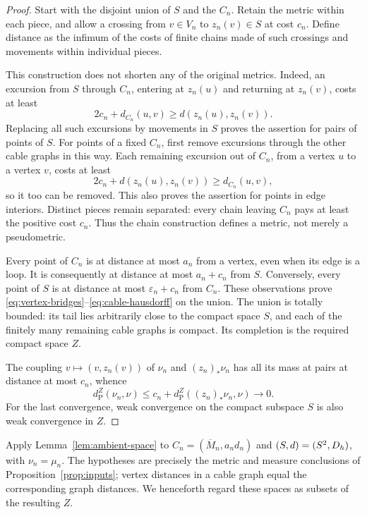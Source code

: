 \begin{proof}
Start with the disjoint union of $S$ and the $C_n$.  Retain the metric
within each piece, and allow a crossing from $v\in V_n$ to $z_n(v)\in S$
at cost $c_n$.  Define distance as the infimum of the costs of finite
chains made of such crossings and movements within individual pieces.

This construction does not shorten any of the original metrics.  Indeed,
an excursion from $S$ through $C_n$, entering at $z_n(u)$ and returning
at $z_n(v)$, costs at least
\[
 2c_n+d_{C_n}(u,v)\ge d(z_n(u),z_n(v)).
\]
Replacing all such excursions by movements in $S$ proves the assertion
for pairs of points of $S$.  For points of a fixed $C_n$, first remove
excursions through the other cable graphs in this way.  Each remaining
excursion out of $C_n$, from a vertex $u$ to a vertex $v$, costs at least
\[
 2c_n+d(z_n(u),z_n(v))\ge d_{C_n}(u,v),
\]
so it too can be removed.  This also proves the assertion for points in
edge interiors.  Distinct pieces remain separated: every chain leaving
$C_n$ pays at least the positive cost $c_n$.  Thus the chain construction
defines a metric, not merely a pseudometric.

Every point of $C_n$ is at distance at most $a_n$ from a vertex, even
when its edge is a loop.  It is consequently at distance at most
$a_n+c_n$ from $S$.  Conversely, every point of $S$ is at distance at
most $\varepsilon_n+c_n$ from $C_n$.  These observations prove
\eqref{eq:vertex-bridges}--\eqref{eq:cable-hausdorff} on the union.  The
union is totally bounded: its tail lies arbitrarily close to the compact
space $S$, and each of the finitely many remaining cable graphs is
compact.  Its completion is the required compact space $Z$.

The coupling $v\mapsto(v,z_n(v))$ of $\nu_n$ and $(z_n)_*\nu_n$ has
all its mass at pairs at distance at most $c_n$, whence
\[
 d_{\mathrm P}^{Z}(\nu_n,\nu)
 \le c_n+d_{\mathrm P}^{Z}((z_n)_*\nu_n,\nu)\longrightarrow0.
\]
For the last convergence, weak convergence on the compact subspace $S$
is also weak convergence in $Z$.
\end{proof}

Apply Lemma~\ref{lem:ambient-space} to
$C_n=(\overline M_n,a_nd_n)$ and $(S,d)=(S^2,D_h)$, with
$\nu_n=\mu_n$.  The hypotheses are precisely the metric and measure
conclusions of Proposition~\ref{prop:inputs}; vertex distances in a
cable graph equal the corresponding graph distances.  We henceforth
regard these spaces as subsets of the resulting $Z$.

